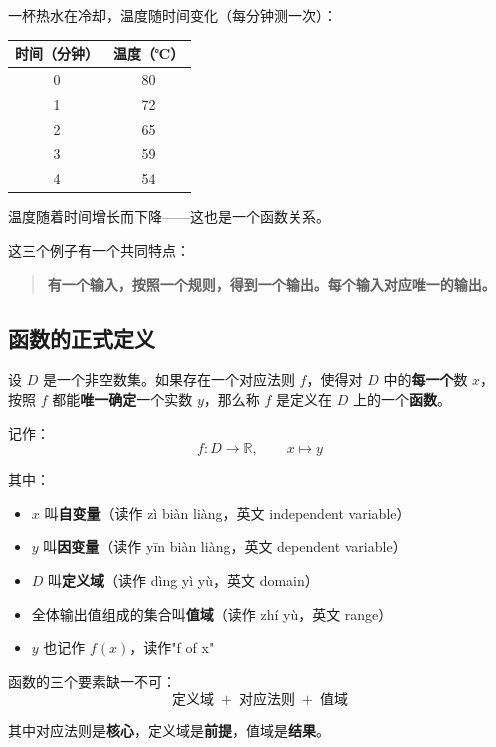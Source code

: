 \begin{examplebox}[3]
一杯热水在冷却，温度随时间变化（每分钟测一次）：

\begin{center}
\begin{tabular}{c|c}
\textbf{时间（分钟）} & \textbf{温度（℃）} \\
\hline
0 & 80 \\
1 & 72 \\
2 & 65 \\
3 & 59 \\
4 & 54 \\
\end{tabular}
\end{center}

温度随着时间增长而下降——这也是一个函数关系。
\end{examplebox}

这三个例子有一个共同特点：

\begin{quote}
\textbf{有一个输入，按照一个规则，得到一个输出。每个输入对应唯一的输出。}
\end{quote}

\subsection{函数的正式定义}

\begin{definitionbox}[函数的概念]
设 \(D\) 是一个非空数集。如果存在一个对应法则 \(f\)，使得对 \(D\) 中的\textbf{每一个}数 \(x\)，
按照 \(f\) 都能\textbf{唯一确定}一个实数 \(y\)，那么称 \(f\) 是定义在 \(D\) 上的一个\textbf{函数}。

记作：
\[
f: D \to \mathbb{R}, \qquad x \mapsto y
\]

其中：
\begin{itemize}
  \item \(x\) 叫\textbf{自变量}（读作 zì biàn liàng，英文 independent variable）
  \item \(y\) 叫\textbf{因变量}（读作 yīn biàn liàng，英文 dependent variable）
  \item \(D\) 叫\textbf{定义域}（读作 dìng yì yù，英文 domain）
  \item 全体输出值组成的集合叫\textbf{值域}（读作 zhí yù，英文 range）
  \item \(y\) 也记作 \(f(x)\)，读作"f of x"
\end{itemize}
\end{definitionbox}

\begin{notebox}
函数的三个要素缺一不可：
\[
\boxed{\mbox{定义域} \;+\; \mbox{对应法则} \;+\; \mbox{值域}}
\]

其中对应法则是\textbf{核心}，定义域是\textbf{前提}，值域是\textbf{结果}。
\end{notebox}


